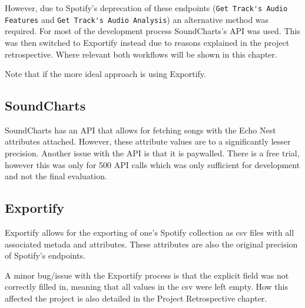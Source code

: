 However, due to Spotify's deprecation of these endpoints (\lstinline|Get Track's Audio Features| and \lstinline|Get Track's Audio Analysis|) an alternative method was required. For most of the development process SoundCharts's API was used. This was then switched to Exportify instead due to reasons explained in the project retrospective. Where relevant both workflows will be shown in this chapter.

Note that if the more ideal approach is using Exportify.

\subsection{SoundCharts}
SoundCharts has an API that allows for fetching songs with the Echo Nest attributes attached. However, these attribute values are to a significantly lesser precision. Another issue with the API is that it is paywalled. There is a free trial, however this was only for 500 API calls which was only sufficient for development and not the final evaluation.

\subsection{Exportify}
Exportify allows for the exporting of one's Spotify collection as csv files with all associated metada and attributes. These attributes are also the original precision of Spotify's endpoints.

A minor bug/issue with the Exportify process is that the explicit field was not correctly filled in, meaning that all values in the csv were left empty. How this affected the project is also detailed in the Project Retrospective chapter.

